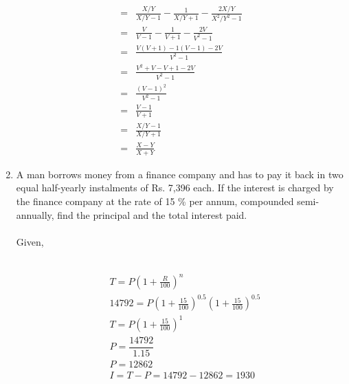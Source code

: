 \documentclass[journal,12pt,twocolumn]{IEEEtran}
\renewcommand\thesection{\arabic{section}}
\begin{document}
\begin{enumerate}[label=\thesection.\arabic*.,ref=\thesection.\theenumi]
\begin{align}
 =&\displaystyle\frac{X/Y}{X/Y-1}-\displaystyle\frac{1}{X/Y+1}-\displaystyle\frac{2X/Y}{X^2/Y^2-1}\\
 =&\displaystyle\frac{V}{V-1}-\displaystyle\frac{1}{V+1}-\displaystyle\frac{2V}{V^2-1}\\
 =&\displaystyle\frac{V(V+1)-1(V-1)-2V}{V^2-1}\\
 =&\displaystyle\frac{V^2+V-V+1-2V}{V^2-1}\\
 =&\displaystyle\frac{(V-1)^2}{V^2-1}\\
 =&\displaystyle\frac{V-1}{V+1}\\
 =&\displaystyle\frac{X/Y-1}{X/Y+1}\\
 =&\displaystyle\frac{X-Y}{X+Y}
\end{align}
\item A man borrows money from a finance company
and has to pay it back in two equal half-yearly
instalments of Rs. 7,396 each. If the interest is
charged by the finance company at the rate of
15 \% per annum, compounded semi-annually,
find the principal and the total interest paid.\\
\solution \\
Given, \\  
\begin{table}[ht]
 \centering
 \caption{}
 \end{table}\\
\begin{align}
&T = P\left(1+\displaystyle\frac{R}{100}\right)^n \\
&14792 = P\left(1+\displaystyle\frac{15}{100}\right)^{0.5}\left(1+\displaystyle\frac{15}{100}\right)^{0.5}\\
& T = P\left(1+\displaystyle\frac{15}{100}\right)^1\\
& P = \dfrac{14792}{1.15}\\
&P = 12862\\
&I = T - P = 14792 - 12862 = 1930 

\end{align}
\end{enumerate}
\end{document}
